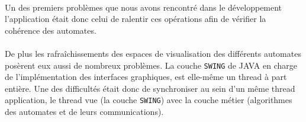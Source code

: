 \paragraph{}
Un des premiers problèmes que nous avons rencontré dans le développement l'application était donc celui de \og ralentir \fg{} ces opérations afin de vérifier la cohérence des automates.

\paragraph{}
De plus les rafraîchissements des espaces de visualisation des différents automates posèrent eux aussi de nombreux problèmes. La couche \texttt{SWING} de \textsc{JAVA} en charge de l'implémentation des interfaces graphiques, est elle-même un thread à part entière. Une des difficultés était donc de synchroniser au sein d'un même thread application, le thread \og vue \fg{} (la couche \texttt{SWING}) avec la couche \og métier \fg{} (algorithmes des automates et de leurs communications).


